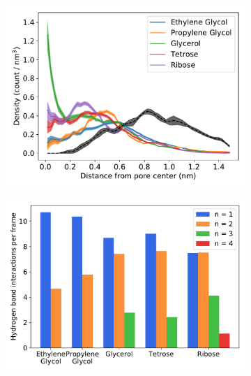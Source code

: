 \documentclass{article}
\begin{document}
  \begin{figure}[!htb]
  \centering
  \begin{subfigure}{0.45\textwidth}
  \includegraphics[width=\linewidth]{polyols_rdf.pdf}
  \caption{}\label{fig:polyols_rdf}
  \end{subfigure}
  \begin{subfigure}{0.45\textwidth}
  \includegraphics[width=\linewidth]{multi_hbonds.pdf}
  \caption{}\label{fig:multi_hbonds}
  \end{subfigure}

\end{figure}
\end{document}
